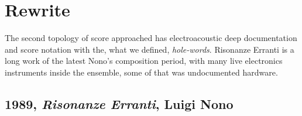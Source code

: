 \documentclass[twoside,a4paper]{article}
\begin{document}
\section{Rewrite}
\label{sec:rewriting}

The second topology of score approached has electroacoustic deep documentation and score notation with the, what we defined, \emph{hole-words}. Risonanze Erranti is a long work of the latest Nono's composition period, with many live electronics instruments inside the ensemble, some of that was undocumented hardware. 


\subsection{1989, \emph{Risonanze Erranti}, Luigi Nono}

%
%
\end{document}
